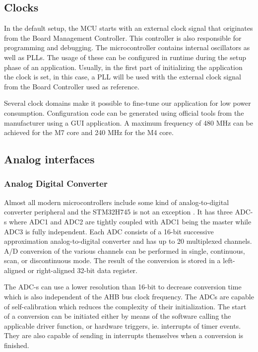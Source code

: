 \subsection{Clocks}

In the default setup, the MCU starts with an external clock signal that originates from the Board Management Controller. This controller is also responsible for programming and debugging. The microcontroller contains internal oscillators as well as PLLs. The usage of these can be configured in runtime during the setup phase of an application. Usually, in the first part of initializing the application the clock is set, in this case, a PLL will be used with the external clock signal from the Board Controller used as reference.

Several clock domains make it possible to fine-tune our application for low power consumption. Configuration code can be generated using official tools from the manufacturer using a GUI application. A maximum frequency of 480 MHz can be achieved for the M7 core and 240 MHz for the M4 core.

\subsection{Analog interfaces}

\subsubsection{Analog Digital Converter}

Almost all modern microcontrollers include some kind of analog-to-digital converter peripheral and the STM32H745 is not an exception \cite{ADCDescription}. It has three ADC-s where ADC1 and ADC2 are tightly coupled with ADC1 being the master while ADC3 is fully independent. Each ADC consists of a 16-bit successive approximation analog-to-digital converter and has up to 20 multiplexed channels. A/D conversion of the various channels can be performed in single, continuous, scan, or discontinuous mode. The result of the conversion is stored in a left-aligned or right-aligned 32-bit data register.

The ADC-s can use a lower resolution than 16-bit to decrease conversion time which is also independent of the AHB bus clock frequency. The ADCs are capable of self-calibration which reduces the complexity of their initialization. The start of a conversion can be initiated either by means of the software calling the applicable driver function, or hardware triggers, ie. interrupts of timer events. They are also capable of sending in interrupts themselves when a conversion is finished.

